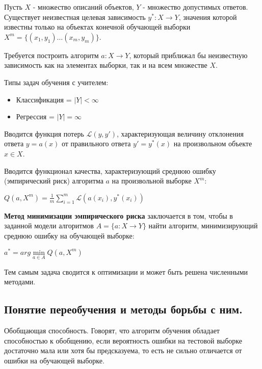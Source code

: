 \documentclass{article}
\begin{document}
Пусть $X$ - множество описаний объектов, $Y$ - множество допустимых ответов.
Существует неизвестная целевая зависимость $y^*: X \to Y$, значения которой
известны только на объектах конечной обучающей выборки $X^m = \{(x_1, y_1)\dots (x_m, y_m)\}$.

Требуется построить алгоритм $a: X \to Y$, который приближал бы неизвестную
зависимость как на элементах выборки, так и на всем множестве $X$.

Типы задач обучения с учителем:
\begin{itemize}
    \item Классификация = $|Y| < \infty$
    \item Регрессия = $|Y| = \infty$
\end{itemize}

Вводится функция потерь $\mathcal{L}(y, y')$, характеризующая величину
отклонения ответа $y = a(x)$ от правильного ответа $y' = y^*(x)$ на
произвольном объекте $x \in X$.

Вводится функционал качества, характеризующий среднюю ошибку
(эмпирический риск) алгоритма $a$ на произвольной выборке $X^m$:

$Q(a, X^m) = \frac{1}{m}\sum\limits_{i=1}^m \mathcal{L}(a(x_i), y^*(x_i))$

\textbf{Метод минимизации эмпирического риска} заключается в том, чтобы
в заданной модели алгоритмов $A = \{a: X \to Y\}$ найти алгоритм, минимизирующий
среднюю ошибку на обучающей выборке:

$a^* = arg \min\limits_{a \in A} Q(a, X^m)$

Тем самым задача сводится к оптимизации и может быть решена численными методами.


\subsection{Понятие переобучения и методы борьбы с ним.}

Обобщающая способность. Говорят, что алгоритм обучения обладает способностью
к обобщению, если вероятность ошибки на тестовой выборке достаточно
мала или хотя бы предсказуема, то есть не сильно отличается от ошибки
на обучающей выборке.

\end{document}
